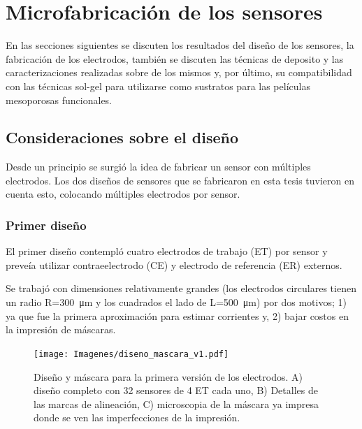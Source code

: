 \section{Microfabricación de los sensores}
		
	 	 En las secciones siguientes se discuten los resultados del diseño de los sensores, la fabricación de los electrodos, también se discuten las técnicas de deposito y las caracterizaciones realizadas sobre de los mismos y, por último, su compatibilidad con las técnicas sol-gel para utilizarse como sustratos para las películas mesoporosas funcionales.

  		\subsection{Consideraciones sobre el diseño}

			Desde un principio se surgió la idea de fabricar un sensor con múltiples electrodos. Los dos diseños de sensores que se fabricaron en esta tesis tuvieron en cuenta esto, colocando múltiples electrodos por sensor. 

		 \subsubsection{Primer diseño}

		 El primer diseño contempló cuatro electrodos de trabajo (ET) por sensor y preveía utilizar contraeelectrodo (CE) y electrodo de referencia (ER) externos. 

		 Se trabajó con dimensiones relativamente grandes (los electrodos circulares tienen un radio R=\SI{300}{\um} y los cuadrados el lado de L=\SI{500}{\um}) por dos motivos; 1) ya que fue la primera aproximación para estimar corrientes y, 2) bajar costos en la impresión de máscaras.
		
				\begin{figure}[th!]
		 	       	\texttt{[image: Imagenes/diseno\_mascara\_v1.pdf]}
 		       		\caption[Primer diseño y máscara de los sensores]{Diseño y máscara para la primera versión de los electrodos. A) diseño completo con 32 sensores de 4 ET cada uno, B) Detalles de las marcas de alineación, C) microscopia de la máscara ya impresa donde se ven las imperfecciones de la impresión.}
 		         	\label{fig:diseno_mascara_v1}
 		     		\end{figure}
		
